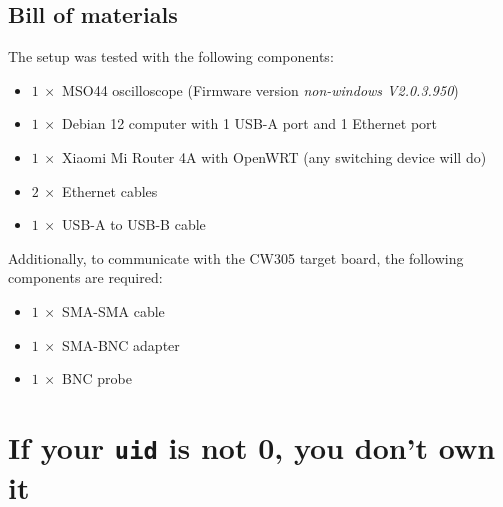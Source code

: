 \documentclass[a4paper,english,twoside,10pt]{article}
\begin{document}
\subsection{Bill of materials}
The setup was tested with the following components:
\begin{itemize}
	\item \(1 \ \times\) MSO44 oscilloscope (Firmware version \textit{non-windows V2.0.3.950})
	\item \(1 \ \times\) Debian 12 computer with 1 USB-A port and 1 Ethernet port
	\item \(1 \ \times\) Xiaomi Mi Router 4A with OpenWRT (any switching device will do)
	\item \(2 \ \times\) Ethernet cables
	\item \(1 \ \times\) USB-A to USB-B cable
\end{itemize}
Additionally, to communicate with the CW305 target board, the following components are required:
\begin{itemize}
	\item \(1 \ \times\) SMA-SMA cable
	\item \(1 \ \times\) SMA-BNC adapter
	\item \(1 \ \times\) BNC probe
\end{itemize}
\section{If your \texttt{uid} is not 0, you don't own it}
\end{document}
